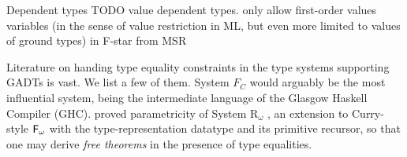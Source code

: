 Dependent types TODO
\citet{Swamy11}
value dependent types.
only allow first-order values
variables
(in the sense of value restriction in ML, but even more limited to
values of ground types)
in F-star from MSR

Literature on handing type equality constraints in the type systems supporting
GADTs is vast. We list a few of them. System $F_{\!C}$ \cite{Sulzmann07} would
arguably be the most influential system, being the intermediate language of
the Glasgow Haskell Compiler (GHC). \citet{VytWei10} proved parametricity of
System $\mathrm{R}_\omega$ \cite{Crary98}, an extension to Curry-style $\mathsf{F}_\omega$
with the type-representation datatype and its primitive recursor, so that
one may derive \emph{free theorems} \cite{Wadler89free} in the presence of
type equalities.

